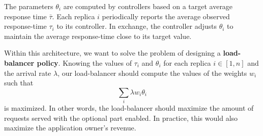 The parameters $\theta_i$ are computed by controllers based on a
target average response time $\bar{\tau}$. Each replica $i$
periodically reports the average observed response-time $\tau_i$ to
its controller. In exchange, the controller adjusts $\theta_i$ to
maintain the average response-time close to its target value.

Within this architecture, we want to solve the problem of designing a
{\bf load-balancer policy}. Knowing the values of $\tau_i$ and $\theta_i$ for
each replica $i \in [1, n]$ and the arrival rate $\lambda$, our
load-balancer should compute the values of the weights $w_i$ such that
\begin{equation}
\sum_{i} \lambda w_i \theta_i
\end{equation}
is maximized. In other words, the load-balancer should maximize the
amount of requests served with the optional part enabled. In practice, this would also maximize
the application owner's revenue.
